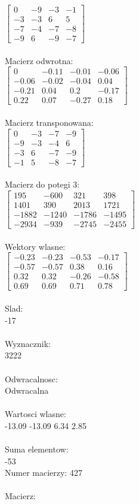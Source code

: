 \documentclass[a4paper,12pt]{article}
\begin{document}
$\begin{bmatrix} 0&-9&-3&-1\\-3&-3&6&5\\-7&-4&-7&-8\\-9&6&-9&-7 \end{bmatrix}$
\\
\\
Macierz odwrotna:\\

$\begin{bmatrix} 0&-0.11&-0.01&-0.06\\-0.06&-0.02&-0.04&0.04\\-0.21&0.04&0.2&-0.17\\0.22&0.07&-0.27&0.18 \end{bmatrix}$
\\
\\
Macierz transponowana:\\

$\begin{bmatrix} 0&-3&-7&-9\\-9&-3&-4&6\\-3&6&-7&-9\\-1&5&-8&-7 \end{bmatrix}$
\\
\\
Macierz do potegi 3:\\

$\begin{bmatrix} 195&-600&321&398\\1401&390&2013&1721\\-1882&-1240&-1786&-1495\\-2934&-939&-2745&-2455 \end{bmatrix}$
\\
\\
Wektory wlasne:\\

$\begin{bmatrix} -0.23&-0.23&-0.53&-0.17\\-0.57&-0.57&0.38&0.16\\0.32&0.32&-0.26&-0.58\\0.69&0.69&0.71&0.78 \end{bmatrix}$
\\
\\
Slad:\\
-17
\\
\\
Wyznacznik:\\
3222
\\
\\
Odwracalnosc:\\
Odwracalna
\\
\\
Wartosci wlasne:\\
-13.09 -13.09 6.34 2.85
\\
\\
Suma elementow:\\
-53
\\
\newpage
Numer macierzy:
427
\\
\\
Macierz:\\
\end{document}
